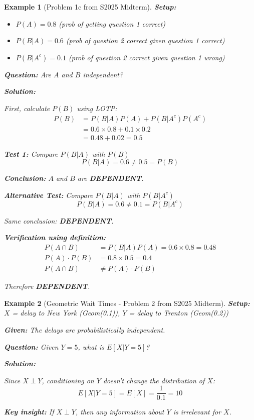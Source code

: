 \documentclass[11pt]{article}
\newtheorem{example}{Example}
\begin{document}
\begin{example}[Problem 1c from S2025 Midterm]
\textbf{Setup:}
\begin{itemize}
    \item $P(A) = 0.8$ (prob of getting question 1 correct)
    \item $P(B|A) = 0.6$ (prob of question 2 correct given question 1 correct)
    \item $P(B|A^c) = 0.1$ (prob of question 2 correct given question 1 wrong)
\end{itemize}

\textbf{Question:} Are $A$ and $B$ independent?

\textbf{Solution:}

First, calculate $P(B)$ using LOTP:
\begin{align*}
P(B) &= P(B|A)P(A) + P(B|A^c)P(A^c)\\
&= 0.6 \times 0.8 + 0.1 \times 0.2\\
&= 0.48 + 0.02 = 0.5
\end{align*}

\textbf{Test 1:} Compare $P(B|A)$ with $P(B)$
\begin{equation}
P(B|A) = 0.6 \neq 0.5 = P(B)
\end{equation}

\textbf{Conclusion:} $A$ and $B$ are \textbf{DEPENDENT}.

\textbf{Alternative Test:} Compare $P(B|A)$ with $P(B|A^c)$
\begin{equation}
P(B|A) = 0.6 \neq 0.1 = P(B|A^c)
\end{equation}

Same conclusion: \textbf{DEPENDENT}.

\textbf{Verification using definition:}
\begin{align*}
P(A \cap B) &= P(B|A)P(A) = 0.6 \times 0.8 = 0.48\\
P(A) \cdot P(B) &= 0.8 \times 0.5 = 0.4\\
P(A \cap B) &\neq P(A) \cdot P(B)
\end{align*}

Therefore \textbf{DEPENDENT}.
\end{example}

\begin{example}[Geometric Wait Times - Problem 2 from S2025 Midterm]
\textbf{Setup:} $X$ = delay to New York (Geom(0.1)), $Y$ = delay to Trenton (Geom(0.2))

\textbf{Given:} The delays are probabilistically independent.

\textbf{Question:} Given $Y = 5$, what is $E[X | Y = 5]$?

\textbf{Solution:}

Since $X \perp Y$, conditioning on $Y$ doesn't change the distribution of $X$:
\begin{equation}
E[X | Y = 5] = E[X] = \frac{1}{0.1} = 10
\end{equation}

\textbf{Key insight:} If $X \perp Y$, then any information about $Y$ is irrelevant for $X$.
\end{example}
\end{document}
